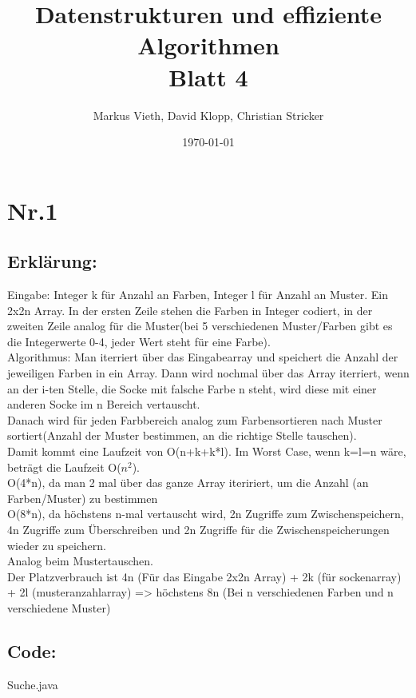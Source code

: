 \documentclass[a4paper,11pt,twoside]{article}
\title{Datenstrukturen und effiziente Algorithmen\\ Blatt 4}
\author{Markus Vieth, David Klopp, Christian Stricker}
\date{\today}
\begin{document}
\maketitle
\cleardoublepage
\pagestyle{myheadings}

\section*{Nr.1}
\subsection*{Erklärung:}
Eingabe: Integer k für Anzahl an Farben, Integer l für Anzahl an Muster. Ein 2x2n Array. In der ersten Zeile stehen die Farben in Integer codiert, in der zweiten Zeile analog für die Muster(bei 5 verschiedenen Muster/Farben gibt es die Integerwerte 0-4, jeder Wert steht für eine Farbe).\\
Algorithmus: Man iterriert über das Eingabearray und speichert die Anzahl der jeweiligen Farben in ein Array. Dann wird nochmal über das Array iterriert, wenn an der i-ten Stelle, die Socke mit falsche Farbe n steht, wird diese mit einer anderen Socke im n Bereich vertauscht.\\
Danach wird für jeden Farbbereich analog zum Farbensortieren nach Muster sortiert(Anzahl der Muster bestimmen, an die richtige Stelle tauschen).\\
Damit kommt eine Laufzeit von O(n+k+k*l). Im Worst Case, wenn k=l=n wäre, beträgt die Laufzeit O($n^2$).\\
O(4*n), da man 2 mal über das ganze Array iteririert, um die Anzahl (an Farben/Muster) zu bestimmen\\
O(8*n), da höchstens n-mal vertauscht wird, 2n Zugriffe zum Zwischenspeichern, 4n Zugriffe zum Überschreiben und 2n Zugriffe für die Zwischenspeicherungen wieder zu speichern.\\
Analog beim Mustertauschen.\\
Der Platzverbrauch ist 4n (Für das Eingabe 2x2n Array) + 2k (für sockenarray) + 2l (musteranzahlarray) => höchstens 8n (Bei n verschiedenen Farben und n verschiedene Muster)

\subsection*{Code:}
 {Suche.java}


\pagebreak
\end{document}
